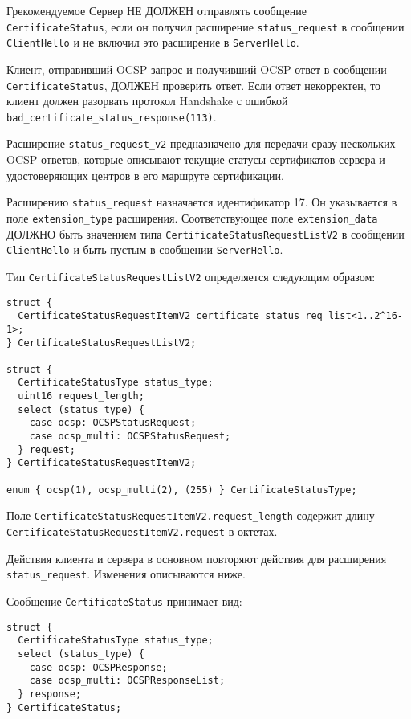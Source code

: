 \begin{appendix}{Г}{рекомендуемое}
Сервер НЕ ДОЛЖЕН отправлять сообщение \lstinline{CertificateStatus}, если он
получил расширение \lstinline{status_request} в сообщении
\lstinline{ClientHello} и не включил это расширение в \lstinline{ServerHello}.

Клиент, отправивший OCSP-запрос и получивший OCSP-ответ в сообщении
\lstinline{CertificateStatus}, ДОЛЖЕН проверить ответ. Если ответ некорректен, 
то клиент должен разорвать протокол Handshake с ошибкой
\lstinline{bad_certificate_status_response(113)}.


Расширение \lstinline{status_request_v2} предназначено для передачи сразу 
нескольких OCSP-ответов, которые описывают текущие статусы сертификатов 
сервера и удостоверяющих центров в его маршруте сертификации.

Расширению \lstinline{status_request} назначается идентификатор 17. Он указывается
в поле \lstinline{extension_type} расширения. Соответствующее поле
\lstinline{extension_data} ДОЛЖНО быть значением типа 
\lstinline{CertificateStatusRequestListV2} в сообщении \lstinline{ClientHello} 
и быть пустым в сообщении \lstinline{ServerHello}. 

Тип \lstinline{CertificateStatusRequestListV2} определяется следующим образом:

\begin{lstlisting}
struct {
  CertificateStatusRequestItemV2 certificate_status_req_list<1..2^16-1>;
} CertificateStatusRequestListV2;

struct {
  CertificateStatusType status_type;
  uint16 request_length;
  select (status_type) {
    case ocsp: OCSPStatusRequest;
    case ocsp_multi: OCSPStatusRequest;
  } request;
} CertificateStatusRequestItemV2;

enum { ocsp(1), ocsp_multi(2), (255) } CertificateStatusType;
\end{lstlisting}

Поле \lstinline{CertificateStatusRequestItemV2.request_length} содержит
длину \lstinline{CertificateStatusRequestItemV2.request} в октетах.

Действия клиента и сервера в основном повторяют действия для расширения 
\lstinline{status_request}. Изменения описываются ниже.

Сообщение \lstinline{CertificateStatus} принимает вид:
\begin{lstlisting}
struct {
  CertificateStatusType status_type;
  select (status_type) {
    case ocsp: OCSPResponse;
    case ocsp_multi: OCSPResponseList;
  } response;
} CertificateStatus;


\end{lstlisting}
\end{appendix}
